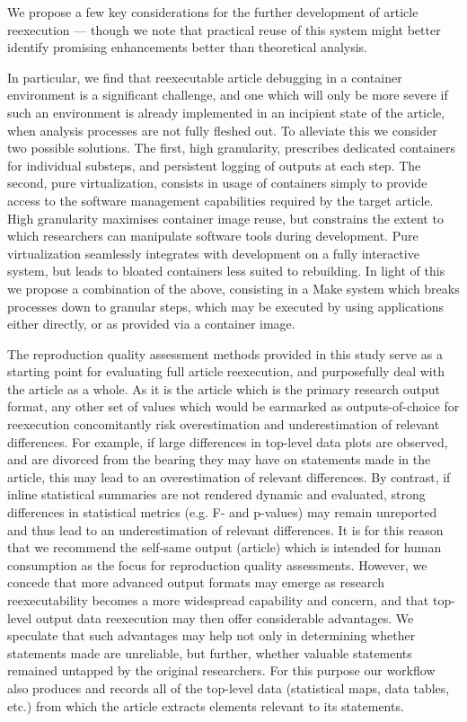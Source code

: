 We propose a few key considerations for the further development of article reexecution — though we note that practical reuse of this system might better identify promising enhancements better than theoretical analysis.

In particular, we find that reexecutable article debugging in a container environment is a significant challenge, and one which will only be more severe if such an environment is already implemented in an incipient state of the article, when analysis processes are not fully fleshed out.
To alleviate this we consider two possible solutions.
The first, high granularity, prescribes dedicated containers for individual substeps, and persistent logging of outputs at each step.
The second, pure virtualization, consists in usage of containers simply to provide access to the software management capabilities required by the target article.
High granularity maximises container image reuse, but constrains the extent to which researchers can manipulate software tools during development.
Pure virtualization seamlessly integrates with development on a fully interactive system, but leads to bloated containers less suited to rebuilding.
In light of this we propose a combination of the above, consisting in a Make system which breaks processes down to granular steps, which may be executed by using applications either directly, or as provided via a container image.

The reproduction quality assessment methods provided in this study serve as a starting point for evaluating full article reexecution, and purposefully deal with the article as a whole.
As it is the article which is the primary research output format, any other set of values which would be earmarked as outputs-of-choice for reexecution concomitantly risk overestimation and underestimation of relevant differences.
For example, if large differences in top-level data plots are observed, and are divorced from the bearing they may have on statements made in the article, this may lead to an overestimation of relevant differences.
By contrast, if inline statistical summaries are not rendered dynamic and evaluated, strong differences in statistical metrics (e.g. F- and p-values) may remain unreported and thus lead to an underestimation of relevant differences.
It is for this reason that we recommend the self-same output (article) which is intended for human consumption as the focus for reproduction quality assessments.
However, we concede that more advanced output formats may emerge as research reexecutability becomes a more widespread capability and concern, and that top-level output data reexecution may then offer considerable advantages.
We speculate that such advantages may help not only in determining whether statements made are unreliable, but further, whether valuable statements remained untapped by the original researchers.
For this purpose our workflow also produces and records all of the top-level data (statistical maps, data tables, etc.) from which the article extracts elements relevant to its statements.

